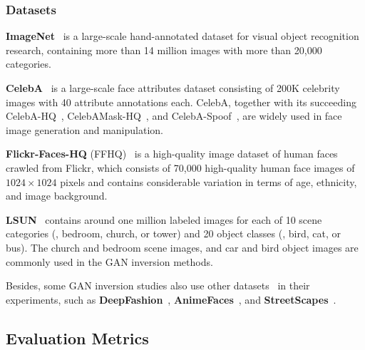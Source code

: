 \subsubsection{Datasets}
\label{sec:datasets}

\vspace{1mm}
\noindent\textbf{ImageNet}~\cite{russakovsky2015imagenet} is a large-scale hand-annotated dataset for visual object recognition research, containing more than 14 million images with more than 20,000 categories.\par

\vspace{1mm}
\noindent\textbf{CelebA}~\cite{liu2015faceattributes} is a large-scale face attributes dataset consisting of 200K celebrity images with 40 attribute annotations each. CelebA, together with its succeeding CelebA-HQ~\cite{karras2017progressive}, CelebAMask-HQ~\cite{CelebAMask-HQ}, and CelebA-Spoof~\cite{CelebA-Spoof}, are widely used in face image generation and manipulation.\par

\vspace{1mm}
\noindent\textbf{Flickr-Faces-HQ} (FFHQ)~\cite{karras2019style,karras2020analyzing} is a high-quality image dataset of human faces crawled from Flickr, which consists of 70,000 high-quality human face images of $1024 \times 1024$ pixels and contains considerable variation in terms of age, ethnicity, and image background.\par

\vspace{1mm}
\noindent\textbf{LSUN}~\cite{yu2015lsun} contains around one million labeled images for each of 10 scene categories (\eg, bedroom, church, or tower) and 20 object classes (\eg, bird, cat, or bus).
The church and bedroom scene images, and car and bird object images are commonly used in the GAN inversion methods.\par

Besides, some GAN inversion studies also use other datasets~\cite{lecun1998mnist,xiao2017fashion,krizhevsky2009learning,chen2014cross,yu2017jittor} in their experiments, such as \textbf{DeepFashion}~\cite{liu2016fashion, liu2016deepfashion, Ge2019DeepFashion2}, \textbf{AnimeFaces}~\cite{jin2017towards}, and \textbf{StreetScapes}~\cite{naik2014streetscore}.

\subsection{Evaluation Metrics}
\label{sec:metrics}

